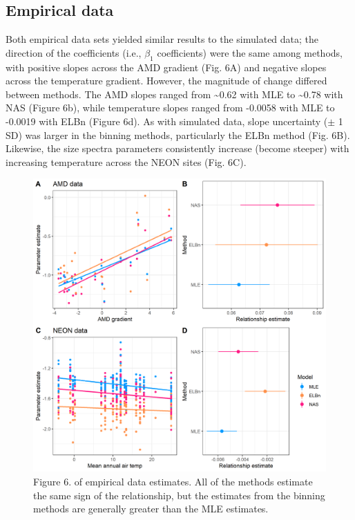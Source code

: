 \documentclass[
]{article}
\begin{document}
\hypertarget{empirical-data-1}{%
\subsection{Empirical data}\label{empirical-data-1}}

Both empirical data sets yielded similar results to the simulated data;
the direction of the coefficients (i.e., \(\beta_1\) coefficients) were
the same among methods, with positive slopes across the AMD gradient
(Fig. 6A) and negative slopes across the temperature gradient. However,
the magnitude of change differed between methods. The AMD slopes ranged
from \textasciitilde0.62 with MLE to \textasciitilde0.78 with NAS
(Figure 6b), while temperature slopes ranged from -0.0058 with MLE to
-0.0019 with ELBn (Figure 6d). As with simulated data, slope uncertainty
(\(\pm\) 1 SD) was larger in the binning methods, particularly the ELBn
method (Fig. 6B). Likewise, the size spectra parameters consistently
increase (become steeper) with increasing temperature across the NEON
sites (Fig. 6C).

\newpage

\begin{figure}
\centering
\includegraphics{figures/empirical_combined.png}
\caption{Figure 6. of empirical data estimates. All of the methods
estimate the same sign of the relationship, but the estimates from the
binning methods are generally greater than the MLE estimates.}
\end{figure}
\end{document}
